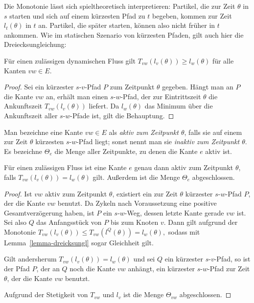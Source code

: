 Die Monotonie lässt sich spieltheoretisch interpretieren:
Partikel, die zur Zeit $\theta$ in $s$ starten und sich auf einem kürzesten Pfad zu $t$ begeben, kommen zur Zeit $l_t(\theta)$ in $t$ an.
Partikel, die später starten, können also nicht früher in $t$ ankommen.
Wie im statischen Szenario von kürzesten Pfaden, gilt auch hier die Dreiecksungleichung: 

\begin{lemma}\label{lemma-dreicksungl}
	Für einen zulässigen dynamischen Fluss gilt 
	$T_{vw}(l_v(\theta)) \geq l_w(\theta)$ für alle Kanten $vw\in E$.
\end{lemma}
\begin{proof}
	Sei ein kürzester $s$-$v$-Pfad $P$ zum Zeitpunkt $\theta$ gegeben.
	Hängt man an $P$ die Kante $vw$ an, erhält man einen $s$-$w$-Pfad, der zur Eintrittszeit $\theta$ die Ankunftszeit $T_{vw}(l_v(\theta))$ liefert.
	Da $l_w(\theta)$ das Minimum über die Ankunftszeit aller $s$-$w$-Pfade ist, gilt die Behauptung.
\end{proof}

\begin{definition}
	Man bezeichne eine Kante $vw\in E$ als \emph{aktiv zum Zeitpunkt $\theta$}, falls sie auf einem zur Zeit $\theta$ kürzesten $s$-$w$-Pfad liegt; sonst nennt man sie \emph{inaktiv zum Zeitpunkt $\theta$}.
	Es bezeichne $\Theta_e$ die Menge aller Zeitpunkte, zu denen die Kante $e$ aktiv ist.
\end{definition}

\begin{proposition}
	Für einen zulässigen Fluss ist eine Kante $e$ genau dann aktiv zum Zeitpunkt $\theta$, falls $T_{vw}(l_v(\theta)) = l_w(\theta)$ gilt.
	Außerdem ist die Menge $\Theta_e$ abgeschlossen.
\end{proposition}
\begin{proof}
	Ist $vw$ aktiv zum Zeitpunkt $\theta$, existiert ein zur Zeit $\theta$ kürzester $s$-$w$-Pfad $P$, der die Kante $vw$ benutzt.
	Da Zykeln nach Voraussetzung eine positive Gesamtverzögerung haben, ist $P$ ein $s$-$w$-Weg, dessen letzte Kante gerade $vw$ ist.
	Sei also $Q$ das Anfangsstück von $P$ bis zum Knoten $v$.
	Dann gilt aufgrund der Monotonie $
	T_{vw}(l_v(\theta)) \leq T_{vw}( l^Q(\theta) ) = l_w(\theta),
	$
	sodass mit Lemma~\ref{lemma-dreicksungl} sogar Gleichheit gilt.
	
	Gilt andersherum $T_{vw}(l_v(\theta)) = l_w(\theta)$ und sei $Q$ ein kürzester $s$-$v$-Pfad, so ist der Pfad $P$, der an $Q$ noch die Kante $vw$ anhängt, ein kürzester $s$-$w$-Pfad zur Zeit $\theta$, der die Kante $vw$ benutzt.
	
	Aufgrund der Stetigkeit von $T_{vw}$ und $l_v$ ist die Menge $\Theta_{vw}$ abgeschlossen.
\end{proof}


